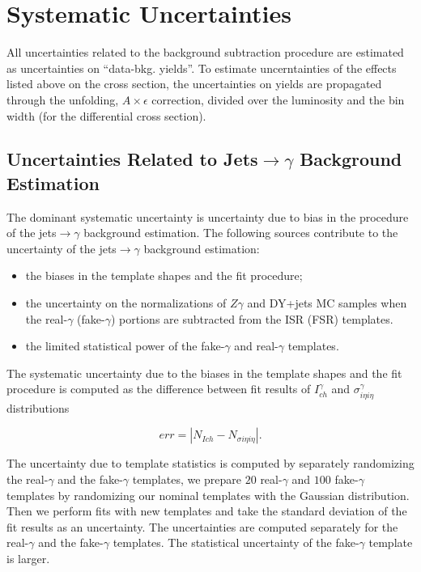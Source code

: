 \section{Systematic Uncertainties}
\label{sec:Systematics}

All uncertainties related to the background subtraction procedure are estimated as uncertainties on ``data-bkg. yields''. To estimate uncerntainties of the effects listed above on the cross section, the uncertainties on yields are propagated through the unfolding, $A \times \epsilon$ correction, divided over the luminosity and the bin width (for the differential cross section).

\subsection{Uncertainties Related to Jets$\rightarrow\gamma$ Background Estimation}

The dominant systematic uncertainty is uncertainty due to bias in the procedure of the jets$\rightarrow\gamma$ background estimation. The following sources contribute to the uncertainty of  the jets$\rightarrow\gamma$ background estimation:

\begin{itemize}
  \item the biases in the template shapes and the fit procedure;
  \item the uncertainty on the normalizations of $Z\gamma$ and DY+jets MC samples when the real-$\gamma$ (fake-$\gamma$) portions are subtracted from the ISR (FSR) templates. 
  \item the limited statistical power of the fake-$\gamma$ and real-$\gamma$ templates.
\end{itemize}

The systematic uncertainty due to the biases in the template shapes and the fit procedure is computed as the difference between fit results of $I_{ch}^\gamma$ and $\sigma_{i\eta i\eta}^\gamma$ distributions

\begin{equation}
  err = |N_{Ich}-N_{\sigma i\eta i\eta}|.
\end{equation}

The uncertainty due to template statistics is computed by separately randomizing the real-$\gamma$ and the fake-$\gamma$ templates, we prepare $20$ real-$\gamma$ and $100$ fake-$\gamma$ templates by randomizing our nominal templates with the Gaussian distribution. Then we perform fits with new templates and take the standard deviation of the fit results as an uncertainty. The uncertainties are computed separately for the real-$\gamma$ and the fake-$\gamma$ templates. The statistical uncertainty of the fake-$\gamma$ template is larger.

